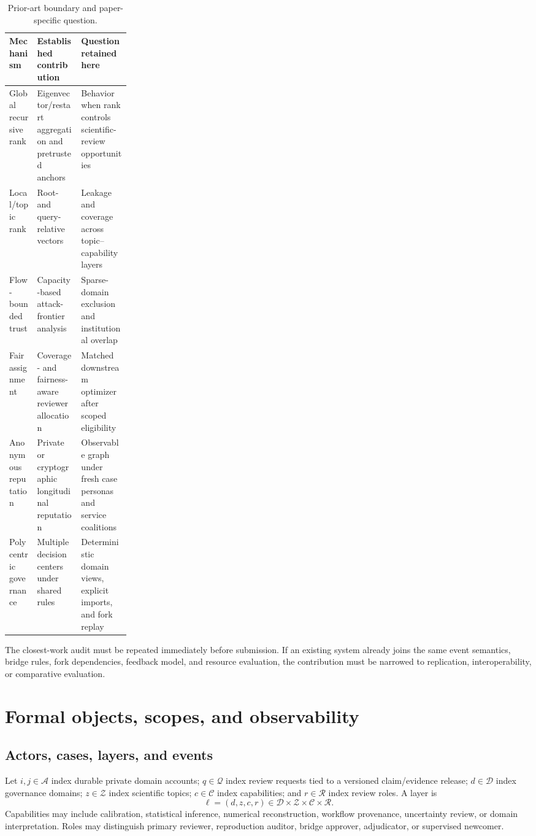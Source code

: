 \documentclass[11pt]{article}
\newcommand{\actors}{\mathcal{A}}
\newcommand{\domains}{\mathcal{D}}
\newcommand{\topics}{\mathcal{Z}}
\newcommand{\caps}{\mathcal{C}}
\newcommand{\roles}{\mathcal{R}}
\begin{document}
\begin{table}[htbp]
\centering
\caption{Prior-art boundary and paper-specific question.}
\label{tab:prior}
\begin{tabularx}{\linewidth}{@{}p{0.23\linewidth}X X@{}}
\toprule
Mechanism & Established contribution & Question retained here \\
\midrule
Global recursive rank & Eigenvector/restart aggregation and pretrusted anchors & Behavior when rank controls scientific-review opportunities \\
Local/topic rank & Root- and query-relative vectors & Leakage and coverage across topic--capability layers \\
Flow-bounded trust & Capacity-based attack-frontier analysis & Sparse-domain exclusion and institutional overlap \\
Fair assignment & Coverage- and fairness-aware reviewer allocation & Matched downstream optimizer after scoped eligibility \\
Anonymous reputation & Private or cryptographic longitudinal reputation & Observable graph under fresh case personas and service coalitions \\
Polycentric governance & Multiple decision centers under shared rules & Deterministic domain views, explicit imports, and fork replay \\
\bottomrule
\end{tabularx}
\end{table}

\begin{evidencegate}
The closest-work audit must be repeated immediately before submission.  If an existing system already joins the same event semantics, bridge rules, fork dependencies, feedback model, and resource evaluation, the contribution must be narrowed to replication, interoperability, or comparative evaluation.
\end{evidencegate}

\section{Formal objects, scopes, and observability}

\subsection{Actors, cases, layers, and events}

Let $i,j\in\actors$ index durable private domain accounts; $q\in\mathcal{Q}$ index review requests tied to a versioned claim/evidence release; $d\in\domains$ index governance domains; $z\in\topics$ index scientific topics; $c\in\caps$ index capabilities; and $r\in\roles$ index review roles.  A layer is
\begin{equation}
 \ell=(d,z,c,r)\in\domains\times\topics\times\caps\times\roles.
\end{equation}
Capabilities may include calibration, statistical inference, numerical reconstruction, workflow provenance, uncertainty review, or domain interpretation.  Roles may distinguish primary reviewer, reproduction auditor, bridge approver, adjudicator, or supervised newcomer.
\end{document}
